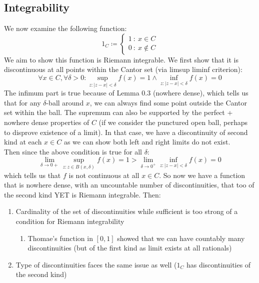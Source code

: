 \documentclass{exam}
\begin{document}
\subsection*{Integrability}
We now examine the following function:
\begin{equation*}
  1_C \coloneq \begin{cases*}
    1 \ : \ x \in C\\
    0 \ : \ x \notin C
  \end{cases*}
\end{equation*}
We aim to show this function is Riemann integrable. We first show that it is discontinuous at all points within the Cantor set (via limsup liminf criterion):
\begin{equation*}
  \forall x \in C, \forall \delta > 0: \sup_{z: |z - x| < \delta}f(x) = 1 \land \inf_{z: |z - x| < \delta}f(x) = 0
\end{equation*}
The infimum part is true because of Lemma 0.3 (nowhere dense), which tells us that for any $\delta$-ball around $x$, we can always find some point outside the Cantor set within the ball. The supremum can also be supported by the perfect + nowhere dense properties of $C$ (if we consider the punctured open ball, perhaps to disprove existence of a limit). In that case, we have a discontinuity of second kind at each $x \in C$ as we can show both left and right limits do not exist.\\

Then since the above condition is true for all $\delta$:
\begin{equation*}
  \lim_{\delta \xrightarrow{} 0+}\sup_{z: z \in B(x, \delta)}f(x) = 1 > \lim_{\delta \xrightarrow{} 0^+}\inf_{z: |z-x| < \delta}f(x) = 0
\end{equation*}
which tells us that $f$ is not continuous at all $x \in C$. So now we have a function that is nowhere dense, with an uncountable number of discontinuities, that too of the second kind YET is Riemann integrable. Then:
\begin{enumerate}
  \item Cardinality of the set of discontinuities while sufficient is too strong of a condition for Riemann integrability
  \begin{enumerate}
    \item Thomae's function in $[0, 1]$ showed that we can have countably many discontinuities (but of the first kind as limit exists at all rationals)
  \end{enumerate}
  \item Type of discontinuities faces the same issue as well ($1_C$ has discontinuities of the second kind)
\end{enumerate}
\end{document}
